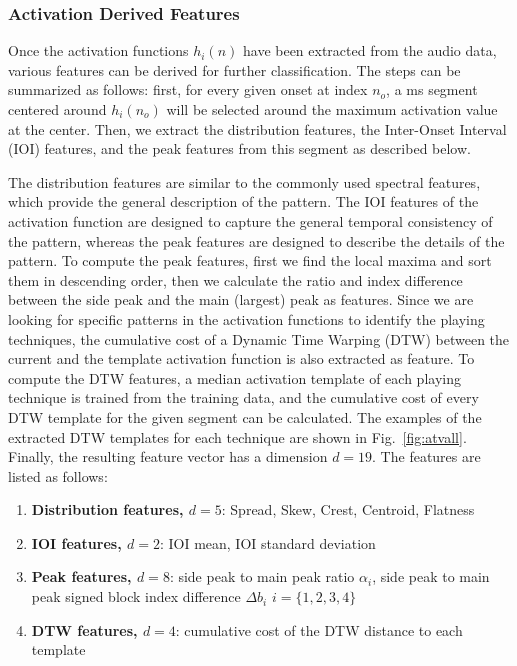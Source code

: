 \documentclass{article}
\begin{document}
\subsubsection{Activation Derived Features}
\label{sssec:activ features}
Once the activation functions $h_{i}(n)$ have been extracted from the audio data, various features can be derived for further classification. The steps can be summarized as follows: first, for every given onset at index $n_{o}$, a \unit[400]{ms} segment centered around $h_{i}(n_{o})$ will be selected around the maximum activation value at the center. Then, we extract the distribution features, the Inter-Onset Interval (IOI) features, and the peak features from this segment as described below. 

{\color{red}{I don't like this structure. I would combine the enumerate with the text, maybe do a paragraph per feature category. Also, make sure the description is understandable; you could also provide a simple graph if that helps.}} The distribution features are similar to the commonly used spectral features, which provide the general description of the pattern. The IOI features of the activation function are designed to capture the general temporal consistency{\color{red}{I don't know what temporal consistency is captured here, what is that anyway?}} of the pattern, whereas the peak features are designed to describe the details of the pattern. To compute the peak features, first we find the local maxima and sort them in descending order, then we calculate the ratio and index difference between the side peak and the main (largest) peak as features. Since we are looking for specific patterns in the activation functions to identify the playing techniques, the cumulative cost of a Dynamic Time Warping (DTW) between the current and the template activation function is also extracted as feature. To compute the DTW features, a median activation template of each playing technique is trained from the training data, and the cumulative cost of every DTW template for the given segment can be calculated. The examples of the extracted DTW templates for each technique are shown in Fig.~\ref{fig:atvall}. Finally, the resulting feature vector has a dimension $d = 19$. The features are listed as follows: {\color{red}{reread the DTW description to see if it is understandble. not completely sure...}}

\begin{enumerate}
	\item \textbf{Distribution features, $d = 5$}: Spread, Skew, Crest, Centroid, Flatness
	\item \textbf{IOI features, $d = 2$}: IOI mean, IOI standard deviation
	\item \textbf{Peak features, $d = 8$}: side peak to main peak ratio $\alpha_{i}$, side peak to main peak signed block index difference $\Delta b_{i}$ $i = \{1, 2, 3, 4\}$
	\item \textbf{DTW features, $d = 4$}: cumulative cost of the  DTW distance to each template {\color{red}{or something like this...}}\\
\end{enumerate}
\end{document}
